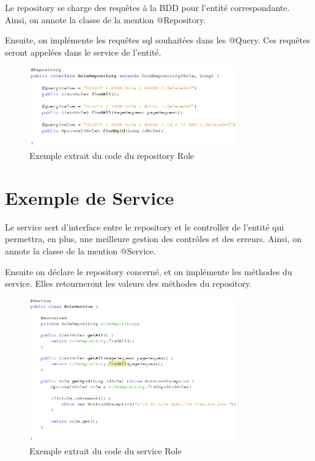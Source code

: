 		Le repository se charge des requêtes à la BDD pour l’entité correspondante.	Ainsi, on annote la classe de la mention @Repository. \newline

		\noindent
		Ensuite, on implémente les requêtes sql souhaitées dans les @Query. Ces requêtes seront appelées dans le service de l'entité.

		\begin{figure}[H]
			\centering\includegraphics[width=0.80\textwidth, keepaspectratio]{res/repository.png}
			\caption{Exemple extrait du code du repository Role}
		\end{figure}

	\section{Exemple de Service}

		Le service sert d’interface entre le repository et le controller de l'entité qui permettra, en plus, une meilleure gestion des contrôles et des erreurs.\newline
		Ainsi, on annote la classe de la mention @Service. \newline

		\noindent
		Ensuite on déclare le repository concerné, et on implémente les méthodes du service. Elles retourneront les valeurs des méthodes du repository.

		\begin{figure}[H]
			\centering\includegraphics[width=0.80\textwidth, keepaspectratio]{res/service.png}
			\caption{Exemple extrait du code du service Role}
		\end{figure}

